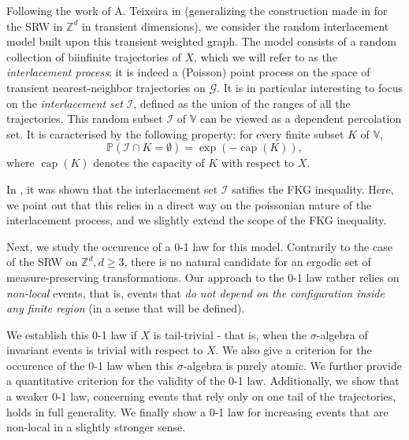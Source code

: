 \documentclass[12pt,a4paper]{article}
\newcommand{\1}[1]{{\mathbf 1}{\{#1\}}}
\newcommand{\Z}{{\mathbb Z}}
\newcommand{\I}{{\mathcal I}}
\newcommand{\bbP}{\mathbb{P}}
\newcommand{\8}{{\infty}}
\newcommand{\capa}{\mathop{\mathrm{cap}}}
\begin{document}
Following the work of A. Teixeira in \cite{Teixeira2009} (generalizing the construction made in \cite{Sznitman2010} for the SRW in $\Z^d$ in transient dimensions), we consider the random interlacement model built upon this transient weighted graph. The model consists of a random collection of biinfinite trajectories of $X$, which we will refer to as the \emph{interlacement process}: it is indeed a (Poisson) point process on the space of transient nearest-neighbor trajectories on $\mathcal{G}$. 
It is in particular interesting to focus on the \emph{interlacement set} $\I$, defined as the union of the ranges of all the trajectories. This random subset $\I$ of $\mathbb{V}$ can be viewed as a dependent percolation set. It is caracterised by the following property: for every finite subset $K$ of $\mathbb{V}$,
\begin{equation}\label{eq:car_prop_I}
  \bbP(\I \cap K = \emptyset)= \exp(- \capa(K)),
\end{equation}
where $\capa(K)$ denotes the capacity of $K$ with respect to $X$.


In \cite{Teixeira2009}, it was shown that the interlacement set $\I$ satifies the FKG inequality. Here, we point out that this relies in a direct way on the poissonian nature of the interlacement process, and we slightly extend the scope of the FKG inequality.

Next, we study the occurence of a 0-1 law for this model. Contrarily to the case of the SRW on $\Z^d, d\ge 3$, %
there is no natural candidate for an ergodic set of measure-preserving transformations. Our approach to the 0-1 law rather relies on \emph{non-local} events, that is, events that \emph{do not depend on the configuration inside any finite region} (in a sense that will be defined). 

We establish this 0-1 law if $X$ is tail-trivial - that is, when the $\sigma$-algebra of invariant events is trivial with respect to $X$. %
We also give a criterion for the occurence of the 0-1 law when this $\sigma$-algebra is purely atomic.
We further provide a quantitative criterion for the validity of the 0-1 law. 
Additionally, we show that a weaker 0-1 law, concerning events that rely only on one tail of the trajectories, holds in full generality. 
We finally show a 0-1 law for increasing events that are non-local in a slightly stronger sense.
\end{document}
